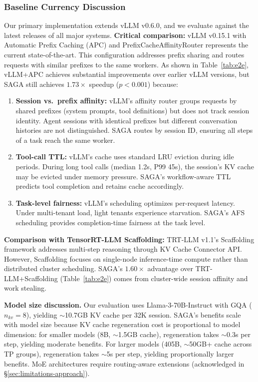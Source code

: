 \documentclass[sigconf]{acmart}
\newcommand{\sysname}{SAGA\xspace}
\begin{document}
\subsubsection{Baseline Currency Discussion}
\label{sec:baseline-currency}

Our primary implementation extends vLLM v0.6.0, and we evaluate against the latest releases of all major systems. \textbf{Critical comparison:} vLLM v0.15.1 with Automatic Prefix Caching (APC) and PrefixCacheAffinityRouter represents the current state-of-the-art. This configuration addresses prefix sharing and routes requests with similar prefixes to the same workers. As shown in Table~\ref{tab:e2e}, vLLM+APC achieves substantial improvements over earlier vLLM versions, but \sysname still achieves $1.73\times$ speedup ($p < 0.001$) because:

\begin{enumerate}[leftmargin=*,noitemsep]
    \item \textbf{Session vs.\ prefix affinity:} vLLM's affinity router groups requests by shared prefixes (system prompts, tool definitions) but does not track session identity. Agent sessions with identical prefixes but different conversation histories are not distinguished. \sysname routes by session ID, ensuring all steps of a task reach the same worker.

    \item \textbf{Tool-call TTL:} vLLM's cache uses standard LRU eviction during idle periods. During long tool calls (median 1.2s, P99 45s), the session's KV cache may be evicted under memory pressure. \sysname's workflow-aware TTL predicts tool completion and retains cache accordingly.

    \item \textbf{Task-level fairness:} vLLM's scheduling optimizes per-request latency. Under multi-tenant load, light tenants experience starvation. \sysname's AFS scheduling provides completion-time fairness at the task level.
\end{enumerate}

\textbf{Comparison with TensorRT-LLM Scaffolding:} TRT-LLM v1.1's Scaffolding framework addresses multi-step reasoning through KV Cache Connector API. However, Scaffolding focuses on single-node inference-time compute rather than distributed cluster scheduling. \sysname's $1.60\times$ advantage over TRT-LLM+Scaffolding (Table~\ref{tab:e2e}) comes from cluster-wide session affinity and work stealing.

\textbf{Model size discussion.} Our evaluation uses Llama-3-70B-Instruct with GQA ($n_{kv}=8$), yielding $\sim$10.7GB KV cache per 32K session. \sysname's benefits scale with model size because KV cache regeneration cost is proportional to model dimension: for smaller models (8B, $\sim$1.5GB cache), regeneration takes $\sim$0.3s per step, yielding moderate benefits. For larger models (405B, $\sim$50GB+ cache across TP groups), regeneration takes $\sim$5s per step, yielding proportionally larger benefits. MoE architectures require routing-aware extensions (acknowledged in \S\ref{sec:limitations-approach}).
\end{document}
